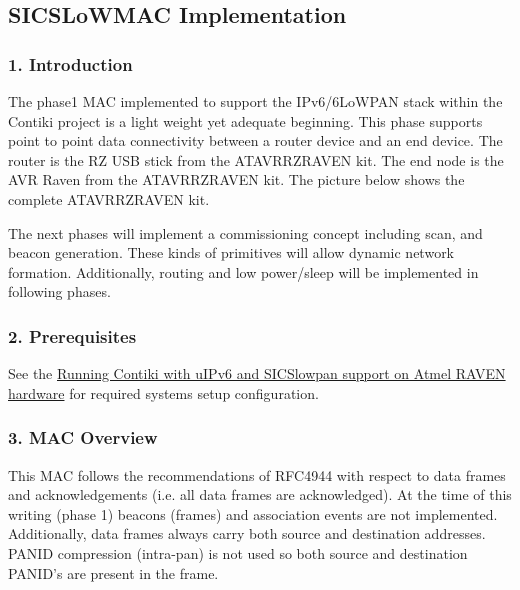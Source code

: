 \hypertarget{a00055}{\subsection{\-S\-I\-C\-S\-Lo\-W\-M\-A\-C \-Implementation}
\label{a00055}
}
\hypertarget{a00055_macintro}{}\subsubsection{1. Introduction}\label{a00055_macintro}
\-The phase1 \-M\-A\-C implemented to support the \-I\-Pv6/6\-Lo\-W\-P\-A\-N stack within the \-Contiki project is a light weight yet adequate beginning. \-This phase supports point to point data connectivity between a router device and an end device. \-The router is the \-R\-Z \-U\-S\-B stick from the \-A\-T\-A\-V\-R\-R\-Z\-R\-A\-V\-E\-N kit. \-The end node is the \-A\-V\-R \-Raven from the \-A\-T\-A\-V\-R\-R\-Z\-R\-A\-V\-E\-N kit. \-The picture below shows the complete \-A\-T\-A\-V\-R\-R\-Z\-R\-A\-V\-E\-N kit.



\-The next phases will implement a commissioning concept including scan, and beacon generation. \-These kinds of primitives will allow dynamic network formation. \-Additionally, routing and low power/sleep will be implemented in following phases.\hypertarget{a00055_macprereqs}{}\subsubsection{2. Prerequisites}\label{a00055_macprereqs}
\-See the \hyperlink{a00058}{\-Running \-Contiki with u\-I\-Pv6 and \-S\-I\-C\-Slowpan support on \-Atmel \-R\-A\-V\-E\-N hardware} for required systems setup configuration.\hypertarget{a00055_macoverview}{}\subsubsection{3. M\-A\-C Overview}\label{a00055_macoverview}
\-This \-M\-A\-C follows the recommendations of \-R\-F\-C4944 with respect to data frames and acknowledgements (i.\-e. all data frames are acknowledged). \-At the time of this writing (phase 1) beacons (frames) and association events are not implemented. \-Additionally, data frames always carry both source and destination addresses. \-P\-A\-N\-I\-D compression (intra-\/pan) is not used so both source and destination \-P\-A\-N\-I\-D's are present in the frame.

